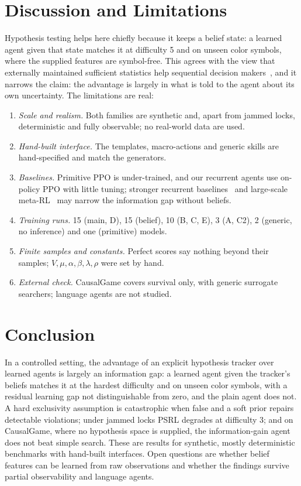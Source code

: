 \documentclass[conference]{IEEEtran}
\begin{document}
\section{Discussion and Limitations}
Hypothesis testing helps here chiefly because it keeps a belief state: a learned agent given that state matches it at difficulty 5 and on unseen color symbols, where the supplied features are symbol-free. This agrees with the view that externally maintained sufficient statistics help sequential decision makers~\cite{krishnamurthy2024}, and it narrows the claim: the advantage is largely in what is told to the agent about its own uncertainty. The limitations are real:
\begin{enumerate}
\item \emph{Scale and realism.} Both families are synthetic and, apart from jammed locks, deterministic and fully observable; no real-world data are used.
\item \emph{Hand-built interface.} The templates, macro-actions and generic skills are hand-specified and match the generators.
\item \emph{Baselines.} Primitive PPO is under-trained, and our recurrent agents use on-policy PPO with little tuning; stronger recurrent baselines~\cite{ni2022} and large-scale meta-RL~\cite{ada2023} may narrow the information gap without beliefs.
\item \emph{Training runs.} 15 (main, D), 15 (belief), 10 (B, C, E), 3 (A, C2), 2 (generic, no inference) and one (primitive) models.
\item \emph{Finite samples and constants.} Perfect scores say nothing beyond their samples; $V,\mu,\alpha,\beta,\lambda,\rho$ were set by hand.
\item \emph{External check.} CausalGame covers survival only, with generic surrogate searchers; language agents are not studied.
\end{enumerate}

\section{Conclusion}
In a controlled setting, the advantage of an explicit hypothesis tracker over learned agents is largely an information gap: a learned agent given the tracker's beliefs matches it at the hardest difficulty and on unseen color symbols, with a residual learning gap not distinguishable from zero, and the plain agent does not. A hard exclusivity assumption is catastrophic when false and a soft prior repairs detectable violations; under jammed locks PSRL degrades at difficulty 3; and on CausalGame, where no hypothesis space is supplied, the information-gain agent does not beat simple search. These are results for synthetic, mostly deterministic benchmarks with hand-built interfaces. Open questions are whether belief features can be learned from raw observations and whether the findings survive partial observability and language agents.
\end{document}
